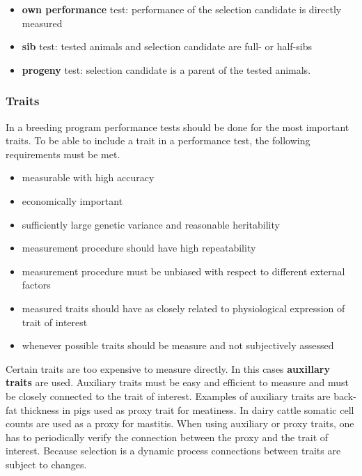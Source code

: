 \documentclass[
]{book}
\providecommand{\tightlist}{%
  \setlength{\itemsep}{0pt}\setlength{\parskip}{0pt}}
\begin{document}
\begin{itemize}
\tightlist
\item
  \textbf{own performance} test: performance of the selection candidate is directly measured
\item
  \textbf{sib} test: tested animals and selection candidate are full- or half-sibs
\item
  \textbf{progeny} test: selection candidate is a parent of the tested animals.
\end{itemize}

\hypertarget{gel-bprog-perftesttrait}{%
\subsubsection{Traits}\label{gel-bprog-perftesttrait}}

In a breeding program performance tests should be done for the most important traits. To be able to include a trait in a performance test, the following requirements must be met.

\begin{itemize}
\tightlist
\item
  measurable with high accuracy
\item
  economically important
\item
  sufficiently large genetic variance and reasonable heritability
\item
  measurement procedure should have high repeatability
\item
  measurement procedure must be unbiased with respect to different external factors
\item
  measured traits should have as closely related to physiological expression of trait of interest
\item
  whenever possible traits should be measure and not subjectively assessed
\end{itemize}

Certain traits are too expensive to measure directly. In this cases \textbf{auxillary traits} are used. Auxiliary traits must be easy and efficient to measure and must be closely connected to the trait of interest. Examples of auxiliary traits are back-fat thickness in pigs used as proxy trait for meatiness. In dairy cattle somatic cell counts are used as a proxy for mastitis. When using auxiliary or proxy traits, one has to periodically verify the connection between the proxy and the trait of interest. Because selection is a dynamic process connections between traits are subject to changes.
\end{document}
